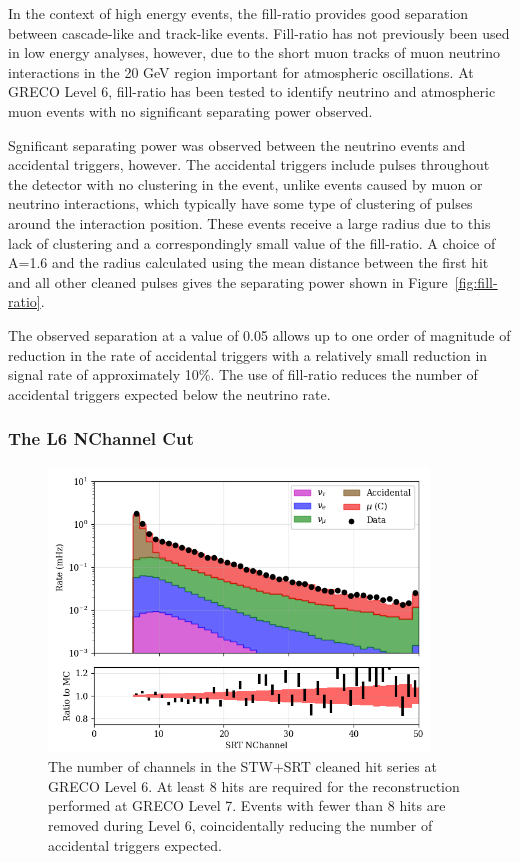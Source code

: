 In the context of high energy events, the fill-ratio provides good separation between cascade-like and track-like events.
Fill-ratio has not previously been used in low energy analyses, however, due to the short muon tracks of muon neutrino interactions in the 20 GeV region important for atmospheric oscillations.
At GRECO Level 6, fill-ratio has been tested to identify neutrino and atmospheric muon events with no significant separating power observed.

Sgnificant separating power was observed between the neutrino events and accidental triggers, however.
The accidental triggers include pulses throughout the detector with no clustering in the event, unlike events caused by muon or neutrino interactions, which typically have some type of clustering of pulses around the interaction position.
These events receive a large radius due to this lack of clustering and a correspondingly small value of the fill-ratio.
A choice of A=1.6 and the radius calculated using the mean distance between the first hit and all other cleaned pulses gives the separating power shown in Figure~\ref{fig:fill-ratio}.

The observed separation at a value of 0.05 allows up to one order of magnitude of reduction in the rate of accidental triggers with a relatively small reduction in signal rate of approximately 10\%.
The use of fill-ratio reduces the number of accidental triggers expected below the neutrino rate.


\subsubsection{The L6 NChannel Cut}
\begin{figure}[h]
	\centering
		\includegraphics[width=0.9\textwidth]{nch.png}
		\caption[The NChannel Distribution]{The number of channels in the STW+SRT cleaned hit series at GRECO Level 6. At least 8 hits are required for the reconstruction performed at GRECO Level 7. Events with fewer than 8 hits are removed during Level 6, coincidentally reducing the number of accidental triggers expected.}
	\label{fig:nchannel}
\end{figure}

